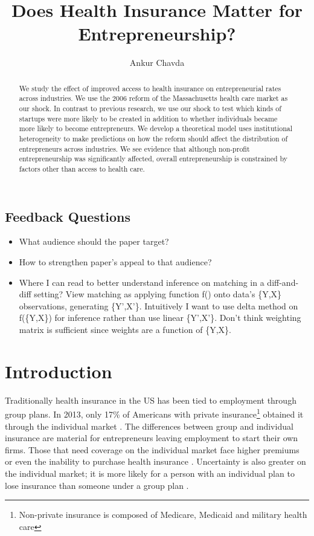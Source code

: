 \documentclass[12pt]{article}
\title{Does Health Insurance Matter for Entrepreneurship?}
\author{Ankur Chavda}
\begin{document}
\maketitle

\begin{abstract}
We study the effect of improved access to health insurance on entrepreneurial rates across industries. We use the 2006 reform of the Massachusetts health care market as our shock. In contrast to previous research, we use our shock to test which kinds of startups were more likely to be created in addition to whether individuals became more likely to become entrepreneurs.  We develop a theoretical model uses institutional heterogeneity to make predictions on how the reform should affect the distribution of entrepreneurs across industries. We see evidence that although non-profit entrepreneurship was significantly affected, overall entrepreneurship is constrained by factors other than access to health care. 
\end{abstract}

\subsection*{Feedback Questions}

\begin{itemize}
	\item What audience should the paper target?
	\item How to strengthen paper's appeal to that audience?
	\item Where I can read to better understand inference on matching in a diff-and-diff setting? View matching as applying function f() onto data's \{Y,X\} observations, generating \{Y',X'\}. Intuitively I want to use delta method on f(\{Y,X\}) for inference rather than use linear \{Y',X'\}. Don't think weighting matrix is sufficient since weights are a function of \{Y,X\}.
\end{itemize}


\section{Introduction}
Traditionally health insurance in the US has been tied to employment through group plans. In 2013, only 17\% of Americans with private insurance\footnote{Non-private insurance is composed of Medicare, Medicaid and military health care} obtained it through the individual market \cite{census}. The differences between group and individual insurance are material for entrepreneurs leaving employment to start their own firms. Those that need coverage on the individual market face higher premiums or even the inability to purchase health insurance \cite{kaiser}. Uncertainty is also greater on the individual market; it is more likely for a person with an individual plan to lose insurance than someone under a group plan \cite{pauly}. 
\end{document}
